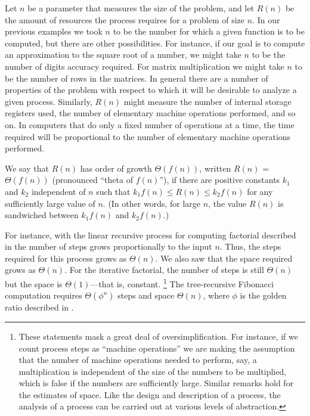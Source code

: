 Let \( n \) be a parameter that measures the size of the problem, and let \( R(n) \) be the amount of resources the process requires for a problem of size \( n \).
In our previous examples we took \( n \) to be the number for which a given function is to be computed, but there are other possibilities.
For instance, if our goal is to compute an approximation to the square root of a number, we might take \( n \) to be the number of digits accuracy required.
For matrix multiplication we might take \( n \) to be the number of rows in the matrices.
In general there are a number of properties of the problem with respect to which it will be desirable to analyze a given process.
Similarly, \( R(n) \) might measure the number of internal storage registers used, the number of elementary machine operations performed, and so on.
In computers that do only a fixed number of operations at a time, the time required will be proportional to the number of elementary machine operations performed.

We say that \( R(n) \) has order of growth \( Θ(f(n)) \), written \( R(n) \) = \( Θ(f(n)) \) (pronounced “theta of \( f(n) \)”), if there are positive constants \( k_1 \) and \( k_2 \) independent of \( n \) such that \( k_1 f(n) ≤ R(n) ≤ k_2 f(n) \) for any sufficiently large value of \( n \).
(In other words, for large \( n \), the value \( R(n) \) is sandwiched between \( k_1 f(n) \) and \( k_2 f(n) \).)

For instance, with the linear recursive process for computing factorial described in  the number of steps grows proportionally to the input \( n \).
Thus, the steps required for this process grows as \( Θ(n) \).
We also saw that the space required grows as \( Θ(n) \).
For the iterative factorial, the number of steps is still \( Θ(n) \) but the space is \( Θ(1) \)---that is, constant.%
\footnote{
	These statements mask a great deal of oversimplification.
	For instance, if we count process steps as “machine operations” we are making the assumption that the number of machine operations needed to perform, say, a multiplication is independent of the size of the numbers to be multiplied, which is false if the numbers are sufficiently large.
	Similar remarks hold for the estimates of space.
	Like the design and description of a process, the analysis of a process can be carried out at various levels of abstraction.
}
The tree-recursive Fibonacci computation requires \( Θ(ϕ^n) \) steps and space \( Θ(n) \), where \( ϕ \) is the golden ratio described in .

